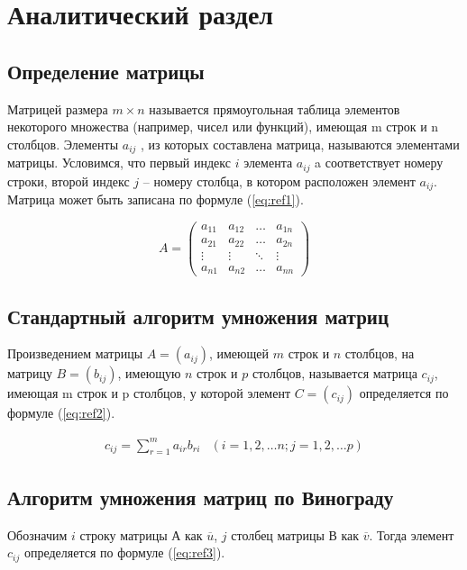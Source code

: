 \chapter{Аналитический раздел}

\section{Определение матрицы}
Матрицей размера $m \times n$ называется прямоугольная таблица элементов некоторого множества 
(например, чисел или функций), имеющая m строк и n столбцов.
Элементы $a_{ij}$ , из которых составлена матрица, называются элементами матрицы.
Условимся, что первый индекс $i$ элемента $a_{ij}$ a
соответствует номеру строки, второй индекс $j$ – номеру столбца, в котором расположен элемент $a_{ij}$.
Матрица может быть записана по формуле (\ref{eq:ref1}).

\begin{equation}
	A = \left(
	\begin{array}{cccc}
		a_{11} & a_{12} & \ldots & a_{1n} \\
		a_{21} & a_{22} & \ldots & a_{2n} \\
		\vdots & \vdots & \ddots & \vdots \\
		a_{n1} & a_{n2} & \ldots & a_{nn}
	\end{array}
	\right)
	\label{eq:ref1}
\end{equation}

\section{Стандартный алгоритм умножения матриц}
Произведением матрицы $A = (a_{ij})$, имеющей $m$ строк и $n$ столбцов, на матрицу $B = (b_{ij})$, имеющую
$n$ строк и $p$ столбцов, называется матрица $c_{ij}$, имеющая m строк и p столбцов, у которой элемент 
$C = (c_{ij})$ определяется по формуле (\ref{eq:ref2}).

\begin{equation}
	\begin{array}{cc}
		c_{ij} = \sum\limits_{r=1}^m a_{ir}b_{ri} & (i=1,2,\dots n; j=1,2,\dots p)
	\end{array}
	\label{eq:ref2}
\end{equation}

\section{Алгоритм умножения матриц по Винограду}
Обозначим $i$ строку матрицы А как  $\overline{u}$, $j$ столбец матрицы В как $\overline{v}$. Тогда элемент $c_{ij}$ определяется по формуле (\ref{eq:ref3}).

